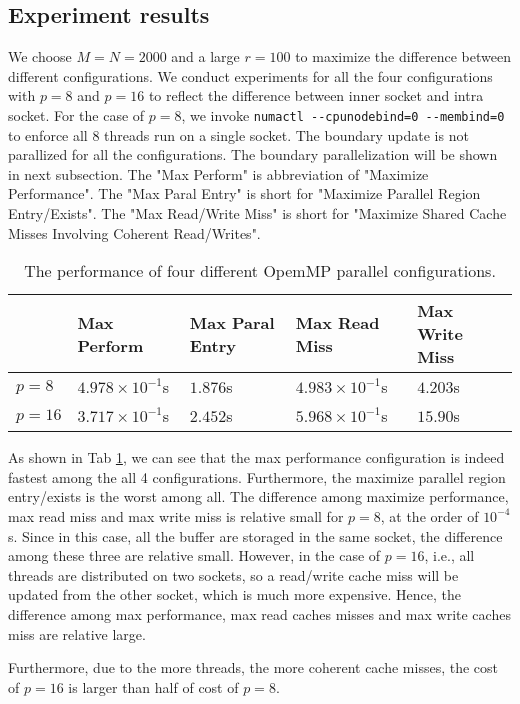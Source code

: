 \subsection{Experiment results}
We choose $M=N=2000$ and a large $r=100$ to maximize the difference between different configurations.
We conduct experiments for all the four configurations with $p=8$ and $p=16$ to reflect the difference between
inner socket and intra socket.
For the case of $p=8$, we invoke \lstinline{numactl --cpunodebind=0 --membind=0} to enforce all 8 threads run on 
a single socket.
The boundary update is not parallized for all the configurations. The boundary parallelization will be 
shown in next subsection.
The "Max Perform" is abbreviation of "Maximize Performance". The "Max Paral Entry"
is short for "Maximize Parallel Region Entry/Exists". The "Max Read/Write Miss" is short for 
"Maximize Shared Cache Misses Involving Coherent Read/Writes".


\begin{table}[h]
	\centering
	\caption{The performance of four different OpemMP parallel configurations.}
	\label{tab1}
	\begin{tabular}{lllll}
		\hline
		             & Max Perform & Max Paral Entry & Max Read Miss & Max Write Miss \\ \hline
		$p=8$            & $4.978\times 10^{-1}$s &  $1.876$s &   $4.983\times 10^{-1}$s &  $4.203$s \\
		$p=16$           & $3.717\times 10^{-1}$s & $2.452$s  & $5.968\times 10^{-1}$s & $15.90$s \\ \hline
	\end{tabular}
\end{table}

As shown in Tab \ref{tab1}, we can see that the max performance configuration is indeed fastest among the all 4 configurations.
Furthermore, the maximize parallel region entry/exists is the worst among all. 
The difference among maximize performance, max read miss and max write miss is relative small for $p=8$, at the order of $10^{-4}$s.
Since in this case, all the buffer are storaged in the same socket, the difference among these three are relative small.
However, in the case of $p=16$, i.e., all threads are distributed on two sockets, so a read/write cache miss will
be updated from the other socket, which is much more expensive. Hence, the difference among max performance, max
read caches misses and max write caches miss are relative large.

Furthermore, due to the more threads, the more coherent cache misses, the cost of $p=16$ is larger than half of cost of $p=8$.

